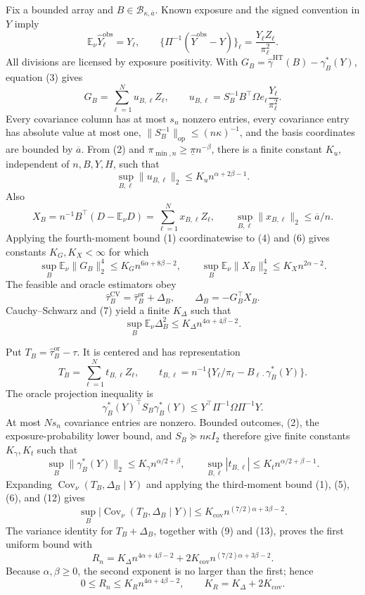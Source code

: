 Fix a bounded array and \(B\in\mathcal B_{\kappa,\overline a}\).  Known exposure and the signed convention in \(Y\) imply
\[
\mathbb E_\nu\widehat Y_\ell^{\mathrm{obs}}=Y_\ell,
\qquad
\{\Pi^{-1}(\widehat Y^{\mathrm{obs}}-Y)\}_\ell
=\frac{Y_\ell Z_\ell}{\pi_\ell^2}.
\tag{3}
\]
All divisions are licensed by exposure positivity.  With \(G_B=\widehat\gamma^{\mathrm{HT}}(B)-\gamma_B^*(Y)\), equation (3) gives
\[
G_B=\sum_{\ell=1}^Nu_{B,\ell}Z_\ell,
\qquad
u_{B,\ell}=S_B^{-1}B^{\top}\Omega e_\ell\frac{Y_\ell}{\pi_\ell^2}.
\tag{4}
\]
Every covariance column has at most \(s_n\) nonzero entries, every covariance entry has absolute value at most one, \(\lVert S_B^{-1}\rVert_{\mathrm{op}}\le(n\kappa)^{-1}\), and the basis coordinates are bounded by \(\overline a\).  From (2) and \(\pi_{\min,n}\ge\underline\pi n^{-\beta}\), there is a finite constant \(K_u\), independent of \(n,B,Y,H\), such that
\[
\sup_{B,\ell}\lVert u_{B,\ell}\rVert_2
\le K_un^{\alpha+2\beta-1}.
\tag{5}
\]
Also
\[
X_B=n^{-1}B^{\top}(D-\mathbb E_\nu D)
=\sum_{\ell=1}^Nx_{B,\ell}Z_\ell,
\qquad
\sup_{B,\ell}\lVert x_{B,\ell}\rVert_2\le\overline a/n.
\tag{6}
\]
Applying the fourth-moment bound (1) coordinatewise to (4) and (6) gives constants \(K_G,K_X<\infty\) for which
\[
\sup_B\mathbb E_\nu\lVert G_B\rVert_2^4
\le K_Gn^{6\alpha+8\beta-2},
\qquad
\sup_B\mathbb E_\nu\lVert X_B\rVert_2^4
\le K_Xn^{2\alpha-2}.
\tag{7}
\]
The feasible and oracle estimators obey
\[
\widehat\tau_B^{\mathrm{CV}}=\widehat\tau_B^{\mathrm{or}}+\Delta_B,
\qquad \Delta_B=-G_B^{\top}X_B.
\tag{8}
\]
Cauchy--Schwarz and (7) yield a finite \(K_\Delta\) such that
\[
\sup_B\mathbb E_\nu\Delta_B^2
\le K_\Delta n^{4\alpha+4\beta-2}.
\tag{9}
\]

Put \(T_B=\widehat\tau_B^{\mathrm{or}}-\tau\).  It is centered and has representation
\[
T_B=\sum_{\ell=1}^Nt_{B,\ell}Z_\ell,
\qquad
t_{B,\ell}=n^{-1}\{Y_\ell/\pi_\ell-B_{\ell\cdot}\gamma_B^*(Y)\}.
\tag{10}
\]
The oracle projection inequality is
\[
\gamma_B^*(Y)^{\top}S_B\gamma_B^*(Y)
\le Y^{\top}\Pi^{-1}\Omega\Pi^{-1}Y.
\tag{11}
\]
At most \(Ns_n\) covariance entries are nonzero.  Bounded outcomes, (2), the exposure-probability lower bound, and \(S_B\succeq n\kappa I_2\) therefore give finite constants \(K_\gamma,K_t\) such that
\[
\sup_B\lVert\gamma_B^*(Y)\rVert_2\le K_\gamma n^{\alpha/2+\beta},
\qquad
\sup_{B,\ell}|t_{B,\ell}|\le K_tn^{\alpha/2+\beta-1}.
\tag{12}
\]
Expanding \(\operatorname{Cov}_\nu(T_B,\Delta_B\mid Y)\) and applying the third-moment bound (1), (5), (6), and (12) gives
\[
\sup_B|\operatorname{Cov}_\nu(T_B,\Delta_B\mid Y)|
\le K_{\mathrm{cov}}n^{(7/2)\alpha+3\beta-2}.
\tag{13}
\]
The variance identity for \(T_B+\Delta_B\), together with (9) and (13), proves the first uniform bound with
\[
R_n=K_\Delta n^{4\alpha+4\beta-2}
+2K_{\mathrm{cov}}n^{(7/2)\alpha+3\beta-2}.
\tag{14}
\]
Because \(\alpha,\beta\ge0\), the second exponent is no larger than the first; hence
\[
0\le R_n\le K_Rn^{4\alpha+4\beta-2},
\qquad K_R=K_\Delta+2K_{\mathrm{cov}}.
\tag{15}
\]


